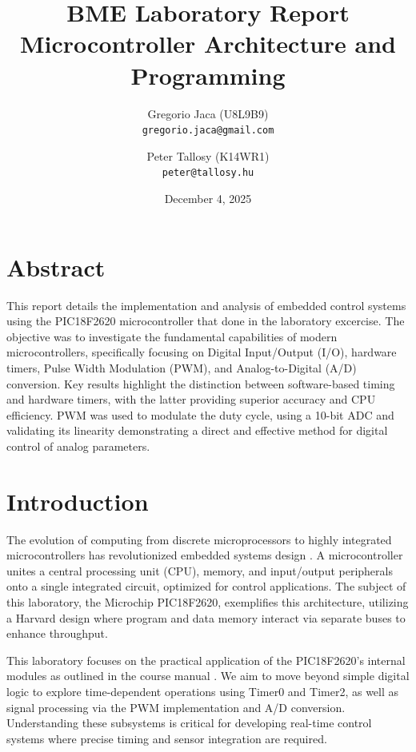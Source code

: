 \documentclass[a4paper,11pt]{article}
\title{\vspace{-2cm}\textbf{\Large BME Laboratory Report}\\[0.5em] \huge Microcontroller Architecture and Programming \vspace{0.5em}}
\author{Gregorio Jaca (U8L9B9) \\ \small\texttt{gregorio.jaca@gmail.com} \and Peter Tallosy (K14WR1) \\ \small\texttt{peter@tallosy.hu}}
\date{December 4, 2025}
\begin{document}
  \maketitle

  \section*{Abstract}
  This report details the implementation and analysis of embedded control systems using the PIC18F2620 microcontroller that done in the laboratory excercise. The objective was to investigate the fundamental capabilities of modern microcontrollers, specifically focusing on Digital Input/Output (I/O), hardware timers, Pulse Width Modulation (PWM), and Analog-to-Digital (A/D) conversion. Key results highlight the distinction between software-based timing and hardware timers, with the latter providing superior accuracy and CPU efficiency. PWM was used to modulate the duty cycle, using a 10-bit ADC and validating its linearity demonstrating a direct and effective method for digital control of analog parameters.

  \section{Introduction}
  The evolution of computing from discrete microprocessors to highly integrated microcontrollers has revolutionized embedded systems design \cite{pic18datasheet}. A microcontroller unites a central processing unit (CPU), memory, and input/output peripherals onto a single integrated circuit, optimized for control applications. The subject of this laboratory, the Microchip PIC18F2620, exemplifies this architecture, utilizing a Harvard design where program and data memory interact via separate buses to enhance throughput.

  This laboratory focuses on the practical application of the PIC18F2620's internal modules as outlined in the course manual \cite{labmanual}. We aim to move beyond simple digital logic to explore time-dependent operations using Timer0 and Timer2, as well as signal processing via the PWM implementation and A/D conversion. Understanding these subsystems is critical for developing real-time control systems where precise timing and sensor integration are required.
\end{document}
